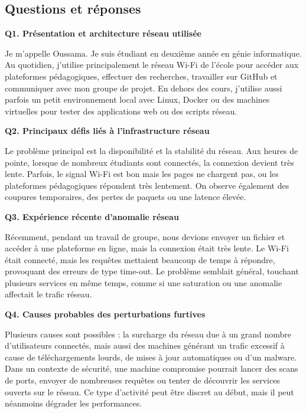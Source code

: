 \documentclass[12pt,a4paper]{article}
\begin{document}
\subsection*{Questions et r\'{e}ponses}

\textbf{Q1. Pr\'{e}sentation et architecture r\'{e}seau utilis\'{e}e}

Je m'appelle Oussama. Je suis \'{e}tudiant en deuxi\`{e}me ann\'{e}e en g\'{e}nie informatique. Au
quotidien, j'utilise principalement le r\'{e}seau Wi-Fi de l'\'{e}cole pour acc\'{e}der aux plateformes
p\'{e}dagogiques, effectuer des recherches, travailler sur GitHub et communiquer avec mon groupe
de projet. En dehors des cours, j'utilise aussi parfois un petit environnement local avec Linux,
Docker ou des machines virtuelles pour tester des applications web ou des scripts r\'{e}seau.

\bigskip
\textbf{Q2. Principaux d\'{e}fis li\'{e}s \`{a} l'infrastructure r\'{e}seau}

Le probl\`{e}me principal est la disponibilit\'{e} et la stabilit\'{e} du r\'{e}seau. Aux heures de pointe,
lorsque de nombreux \'{e}tudiants sont connect\'{e}s, la connexion devient tr\`{e}s lente. Parfois, le
signal Wi-Fi est bon mais les pages ne chargent pas, ou les plateformes p\'{e}dagogiques
r\'{e}pondent tr\`{e}s lentement. On observe \'{e}galement des coupures temporaires, des pertes de
paquets ou une latence \'{e}lev\'{e}e.

\bigskip
\textbf{Q3. Exp\'{e}rience r\'{e}cente d'anomalie r\'{e}seau}

R\'{e}cemment, pendant un travail de groupe, nous devions envoyer un fichier et acc\'{e}der \`{a} une
plateforme en ligne, mais la connexion \'{e}tait tr\`{e}s lente. Le Wi-Fi \'{e}tait connect\'{e}, mais les
requ\^{e}tes mettaient beaucoup de temps \`{a} r\'{e}pondre, provoquant des erreurs de type time-out.
Le probl\`{e}me semblait g\'{e}n\'{e}ral, touchant plusieurs services en m\^{e}me temps, comme si une
saturation ou une anomalie affectait le trafic r\'{e}seau.

\bigskip
\textbf{Q4. Causes probables des perturbations furtives}

Plusieurs causes sont possibles : la surcharge du r\'{e}seau due \`{a} un grand nombre d'utilisateurs
connect\'{e}s, mais aussi des machines g\'{e}n\'{e}rant un trafic excessif \`{a} cause de t\'{e}l\'{e}chargements
lourds, de mises \`{a} jour automatiques ou d'un malware. Dans un contexte de s\'{e}curit\'{e}, une
machine compromise pourrait lancer des scans de ports, envoyer de nombreuses requ\^{e}tes ou
tenter de d\'{e}couvrir les services ouverts sur le r\'{e}seau. Ce type d'activit\'{e} peut \^{e}tre discret au
d\'{e}but, mais il peut n\'{e}anmoins d\'{e}grader les performances.
\end{document}
